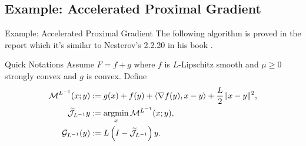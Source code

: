 \documentclass[11pt]{beamer}
\begin{document}
    \subsection{Example: Accelerated Proximal Gradient}
        \begin{frame}{Example: Accelerated Proximal Gradient}
            The following algorithm is proved in the report which it's similar to Nesterov's 2.2.20 in his book \cite{nesterov_lectures_2018}. 
            \begin{block}{Quick Notations}
                Assume $F = f + g$ where $f$ is $L$-Lipschitz smooth and $\mu \ge 0$ strongly convex and $g$ is convex. 
                Define
                \begin{align*}
                    \mathcal M^{L^{-1}}(x; y) 
                    &:= g(x) + f(y) 
                    + 
                    \left\langle \nabla f(y), x - y\right\rangle 
                    + 
                    \frac{L}{2}\Vert x - y\Vert^2, 
                    \\
                    \widetilde{\mathcal J}_{L^{-1}}y 
                    &:= \mathop{\rm argmin}\limits_{x} \mathcal M^{L^{-1}}(x; y), 
                    \\
                    \mathcal G_{L^{-1}}(y)
                    &:= L\left(I - \widetilde{\mathcal J}_{L^{-1}}\right)y. 
                \end{align*}
            \end{block}
        \end{frame}
\end{document}
